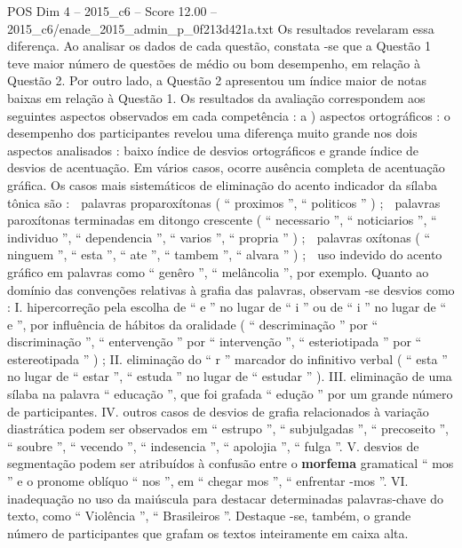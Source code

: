 \begin{textsample}{POS Dim 4 – 2015\_c6 – Score 12.00 – 2015\_c6/enade\_2015\_admin\_p\_0f213d421a.txt}
Os resultados revelaram essa diferença.
Ao analisar os dados de cada questão, constata -se que a Questão 1 teve maior número de questões de médio ou bom desempenho, em relação à Questão 2.
Por outro lado, a Questão 2 apresentou um índice maior de notas baixas em relação à Questão 1.
Os resultados da avaliação correspondem aos seguintes aspectos observados em cada competência : a ) aspectos ortográficos : o desempenho dos participantes revelou uma diferença muito grande nos dois aspectos analisados : baixo índice de desvios ortográficos e grande índice de desvios de acentuação.
Em vários casos, ocorre ausência completa de acentuação gráfica.
Os casos mais sistemáticos de eliminação do acento indicador da sílaba tônica são :  palavras proparoxítonas ( “ proximos ”, “ politicos ” ) ;  palavras paroxítonas terminadas em ditongo crescente ( “ necessario ”, “ noticiarios ”, “ individuo ”, “ dependencia ”, “ varios ”, “ propria ” ) ;  palavras oxítonas ( “ ninguem ”, “ esta ”, “ ate ”, “ tambem ”, “ alvara ” ) ;  uso indevido do acento gráfico em palavras como “ genêro ”, “ melâncolia ”, por exemplo.
Quanto ao domínio das convenções relativas à grafia das palavras, observam -se desvios como : I. hipercorreção pela escolha de “ e ” no lugar de “ i ” ou de “ i ” no lugar de “ e ”, por influência de hábitos da oralidade ( “ descriminação ” por “ discriminação ”, “ entervenção ” por “ intervenção ”, “ esteriotipada ” por “ estereotipada ” ) ; II. eliminação do “ r ” marcador do infinitivo verbal ( “ esta ” no lugar de “ estar ”, “ estuda ” no lugar de “ estudar ” ).
III. eliminação de uma sílaba na palavra “ educação ”, que foi grafada “ edução ” por um grande número de participantes.
IV. outros casos de desvios de grafia relacionados à variação diastrática podem ser observados em “ estrupo ”, “ subjulgadas ”, “ precoseito ”, “ soubre ”, “ vecendo ”, “ indesencia ”, “ apolojia ”, “ fulga ”.
V. desvios de segmentação podem ser atribuídos à confusão entre o \textbf{morfema} gramatical “ mos ” e o pronome oblíquo “ nos ”, em “ chegar mos ”, “ enfrentar -mos ”.
VI. inadequação no uso da maiúscula para destacar determinadas palavras-chave do texto, como “ Violência ”, “ Brasileiros ”.
Destaque -se, também, o grande número de participantes que grafam os textos inteiramente em caixa alta.

\end{textsample}
